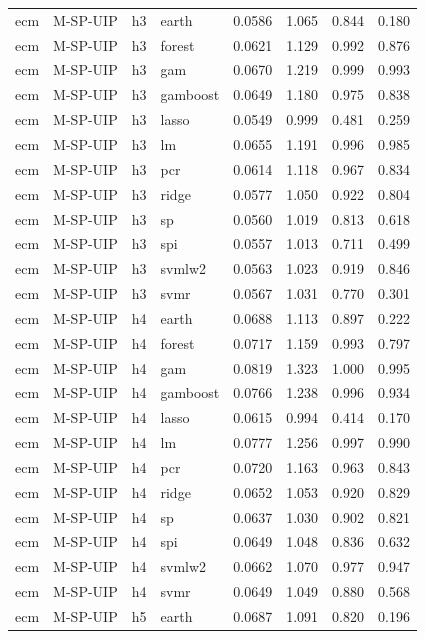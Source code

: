 \begin{ThreePartTable}
\begin{longtable}[t]{llclcccc}
\addlinespace
ecm & M-SP-UIP & h3 & earth & 0.0586 & 1.065 & 0.844 & 0.180\\
ecm & M-SP-UIP & h3 & forest & 0.0621 & 1.129 & 0.992 & 0.876\\
ecm & M-SP-UIP & h3 & gam & 0.0670 & 1.219 & 0.999 & 0.993\\
ecm & M-SP-UIP & h3 & gamboost & 0.0649 & 1.180 & 0.975 & 0.838\\
ecm & M-SP-UIP & h3 & lasso & 0.0549 & 0.999 & 0.481 & 0.259\\
ecm & M-SP-UIP & h3 & lm & 0.0655 & 1.191 & 0.996 & 0.985\\
ecm & M-SP-UIP & h3 & pcr & 0.0614 & 1.118 & 0.967 & 0.834\\
ecm & M-SP-UIP & h3 & ridge & 0.0577 & 1.050 & 0.922 & 0.804\\
ecm & M-SP-UIP & h3 & sp & 0.0560 & 1.019 & 0.813 & 0.618\\
ecm & M-SP-UIP & h3 & spi & 0.0557 & 1.013 & 0.711 & 0.499\\
ecm & M-SP-UIP & h3 & svmlw2 & 0.0563 & 1.023 & 0.919 & 0.846\\
ecm & M-SP-UIP & h3 & svmr & 0.0567 & 1.031 & 0.770 & 0.301\\
\addlinespace
ecm & M-SP-UIP & h4 & earth & 0.0688 & 1.113 & 0.897 & 0.222\\
ecm & M-SP-UIP & h4 & forest & 0.0717 & 1.159 & 0.993 & 0.797\\
ecm & M-SP-UIP & h4 & gam & 0.0819 & 1.323 & 1.000 & 0.995\\
ecm & M-SP-UIP & h4 & gamboost & 0.0766 & 1.238 & 0.996 & 0.934\\
ecm & M-SP-UIP & h4 & lasso & 0.0615 & 0.994 & 0.414 & 0.170\\
ecm & M-SP-UIP & h4 & lm & 0.0777 & 1.256 & 0.997 & 0.990\\
ecm & M-SP-UIP & h4 & pcr & 0.0720 & 1.163 & 0.963 & 0.843\\
ecm & M-SP-UIP & h4 & ridge & 0.0652 & 1.053 & 0.920 & 0.829\\
ecm & M-SP-UIP & h4 & sp & 0.0637 & 1.030 & 0.902 & 0.821\\
ecm & M-SP-UIP & h4 & spi & 0.0649 & 1.048 & 0.836 & 0.632\\
ecm & M-SP-UIP & h4 & svmlw2 & 0.0662 & 1.070 & 0.977 & 0.947\\
ecm & M-SP-UIP & h4 & svmr & 0.0649 & 1.049 & 0.880 & 0.568\\
\addlinespace
ecm & M-SP-UIP & h5 & earth & 0.0687 & 1.091 & 0.820 & 0.196\\

\end{longtable}
\end{ThreePartTable}
